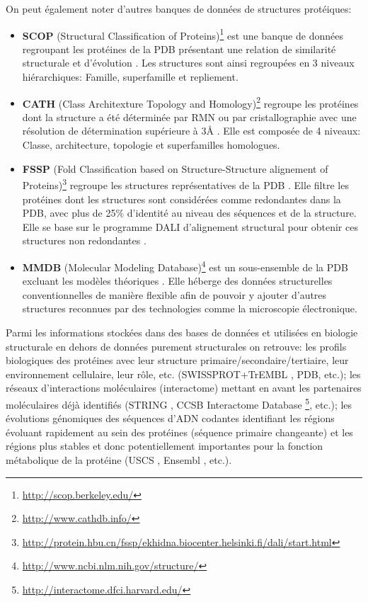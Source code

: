 On peut également noter d'autres banques de données de structures protéiques:
\begin{itemize}
	\item \textbf{SCOP} (Structural Classification of Proteins)\footnote{\url{http://scop.berkeley.edu/}} est une banque de données regroupant les protéines de la PDB présentant une relation de similarité structurale et d'évolution \cite{murzin1995scop}. Les structures sont ainsi regroupées en 3 niveaux hiérarchiques: Famille, superfamille et repliement.
	\item \textbf{CATH} (Class Architexture Topology and Homology)\footnote{\url{http://www.cathdb.info/}} regroupe les protéines dont la structure a été déterminée par RMN ou par cristallographie avec une résolution de détermination supérieure à 3\r{A} \cite{sillitoe2015cath}. Elle est composée de 4 niveaux: Classe, architecture, topologie et superfamilles homologues.
	\item \textbf{FSSP} (Fold Classification based on Structure-Structure alignement of Proteins)\footnote{\url{http://protein.hbu.cn/fssp/ekhidna.biocenter.helsinki.fi/dali/start.html}} regroupe les structures représentatives de la PDB \cite{holm1996mapping}. Elle filtre les protéines dont les structures sont considérées comme redondantes dans la PDB, avec plus de 25\% d'identité au niveau des séquences et de la structure. Elle se base sur le programme DALI d'alignement structural pour obtenir ces structures non redondantes \cite{holm1998touring}.
	\item \textbf{MMDB} (Molecular Modeling Database)\footnote{\url{http://www.ncbi.nlm.nih.gov/structure/}} est un sous-ensemble de la PDB excluant les modèles théoriques \cite{madej2014mmdb}. Elle héberge des données structurelles conventionnelles de manière flexible afin de pouvoir y ajouter d'autres structures reconnues par des technologies comme la microscopie électronique.
\end{itemize}

Parmi les informations stockées dans des bases de données et utilisées en biologie structurale en dehors de données purement structurales on retrouve: les profils biologiques des protéines avec leur structure primaire/secondaire/tertiaire, leur environnement cellulaire, leur rôle, etc. (SWISSPROT+TrEMBL \cite{boeckmann2003swiss}, PDB, etc.); les réseaux d'interactions moléculaires (interactome) mettant en avant les partenaires moléculaires déjà identifiés (STRING \cite{Snel15092000}, CCSB Interactome Database \footnote{\url{http://interactome.dfci.harvard.edu/}}, etc.); les évolutions génomiques des séquences d'ADN codantes identifiant les régions évoluant rapidement au sein des protéines (séquence primaire changeante) et les régions plus stables et donc potentiellement importantes pour la fonction métabolique de la protéine (USCS \cite{kent2002human}, Ensembl \cite{hubbard2002ensembl}, etc.). 

